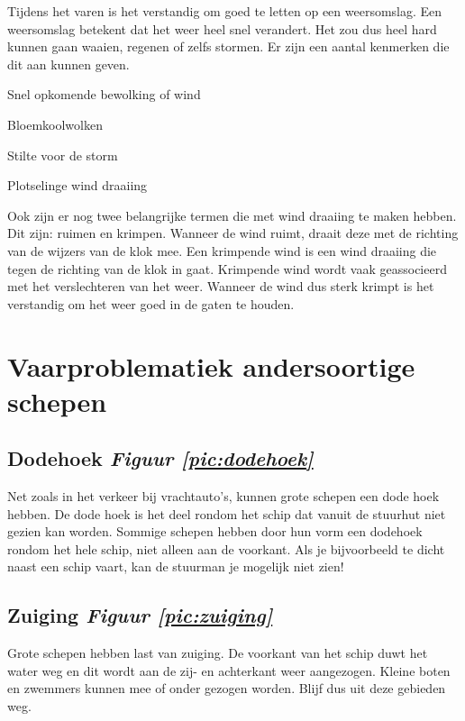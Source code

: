 Tijdens het varen is het verstandig om goed te letten op een weersomslag. Een weersomslag betekent dat het weer heel snel verandert. Het zou dus heel hard kunnen gaan waaien, regenen of zelfs stormen. Er zijn een aantal kenmerken die dit aan kunnen geven. 
\begin{itemize}
    \begin{multicols}{2}
    \item Snel opkomende bewolking of wind
    \item Bloemkoolwolken
    \item Stilte voor de storm
    \item Plotselinge wind draaiing
    \end{multicols}
\end{itemize}
Ook zijn er nog twee belangrijke termen die met wind draaiing te maken hebben. Dit zijn: ruimen en krimpen. Wanneer de wind ruimt, draait deze met de richting van de wijzers van de klok mee. Een krimpende wind is een wind draaiing die tegen de richting van de klok in gaat. Krimpende wind wordt vaak geassocieerd met het verslechteren van het weer. Wanneer de wind dus sterk krimpt is het verstandig om het weer goed in de gaten te houden.


\section{Vaarproblematiek andersoortige schepen}
\subsection{Dodehoek \hfill \textit{Figuur \ref{pic:dodehoek}}}
Net zoals in het verkeer bij vrachtauto's, kunnen grote schepen een dode hoek hebben. De dode hoek is het deel rondom het schip dat vanuit de stuurhut niet gezien kan worden. Sommige schepen hebben door hun vorm een dodehoek rondom het hele schip, niet alleen aan de voorkant. Als je bijvoorbeeld te dicht naast een schip vaart, kan de stuurman je mogelijk niet zien!

\subsection{Zuiging \hfill \textit{Figuur \ref{pic:zuiging}}}
Grote schepen hebben last van zuiging. De voorkant van het schip duwt het water weg en dit wordt aan de zij- en achterkant weer aangezogen. Kleine boten en zwemmers kunnen mee of onder gezogen worden. Blijf dus uit deze gebieden weg.

